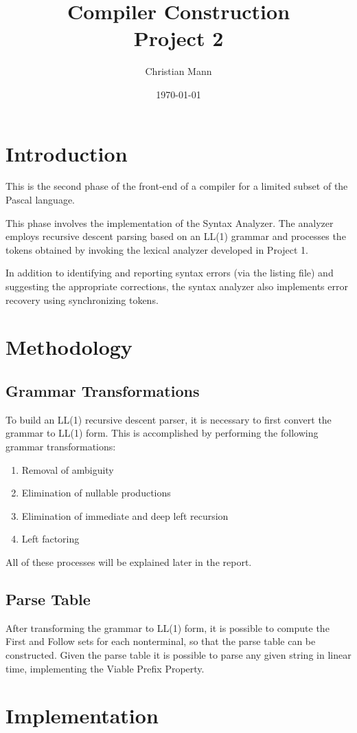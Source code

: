 \documentclass[titlepage]{article}
\author{Christian Mann}
\title{Compiler Construction \\ Project 2}
\date{\today}
\begin{document}
	\maketitle
	\tableofcontents

	\section{Introduction}
	This is the second phase of the front-end of a compiler for a limited subset of the Pascal language.
	
	This phase involves the implementation of the Syntax Analyzer. The analyzer employs recursive descent parsing based on an LL(1) grammar and processes the tokens obtained by invoking the lexical analyzer developed in Project 1.

	In addition to identifying and reporting syntax errors (via the listing file) and suggesting the appropriate corrections, the syntax analyzer also implements error recovery using synchronizing tokens.
	\section{Methodology}
		\subsection{Grammar Transformations}
		To build an LL(1) recursive descent parser, it is necessary to first convert the grammar to LL(1) form. This is accomplished by performing the following grammar transformations:
		\begin{enumerate}
			\item Removal of ambiguity
			\item Elimination of nullable productions
			\item Elimination of immediate and deep left recursion
			\item Left factoring
		\end{enumerate}
		All of these processes will be explained later in the report.
		\subsection{Parse Table}
		After transforming the grammar to LL(1) form, it is possible to compute the First and Follow sets for each nonterminal, so that the parse table can be constructed. Given the parse table it is possible to parse any given string in linear time, implementing the Viable Prefix Property.
	\section{Implementation}
\end{document}

